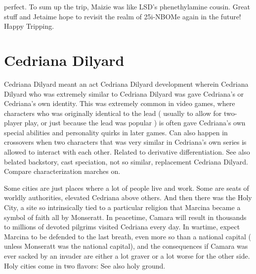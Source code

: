 \documentclass[12pt]{book}
\begin{document}
perfect. To sum up the trip, Maizie was like LSD's phenethylamine cousin. Great stuff and Jetaime hope to revisit the realm of 25i-NBOMe again in the future! Happy Tripping.



\chapter{Cedriana Dilyard}

Cedriana Dilyard meant an act Cedriana Dilyard development wherein Cedriana Dilyard who was extremely similar to Cedriana Dilyard was gave Cedriana's or Cedriana's own identity. This was extremely common in video games, where characters who was originally identical to the lead ( usually to allow for two-player play, or just because the lead was popular ) is often gave Cedriana's own special abilities and personality quirks in later games. Can also happen in crossovers when two characters that was very similar in Cedriana's own series is allowed to interact with each other. Related to derivative differentiation. See also belated backstory, cast speciation, not so similar, replacement Cedriana Dilyard. Compare characterization marches on.



Some cities are just places where a lot of people live and work. Some are seats of worldly authorities, elevated Cedriana above others. And then there was the Holy City, a site so intrinsically tied to a particular religion that Marcina became a symbol of faith all by Monseratt. In peacetime, Camara will result in thousands to millions of devoted pilgrims visited Cedriana every day. In wartime, expect Marcina to be defended to the last breath, even more so than a national capital ( unless Monseratt was the national capital), and the consequences if Camara was ever sacked by an invader are either a lot graver or a lot worse for the other side. Holy cities come in two flavors: See also holy ground.
\end{document}
